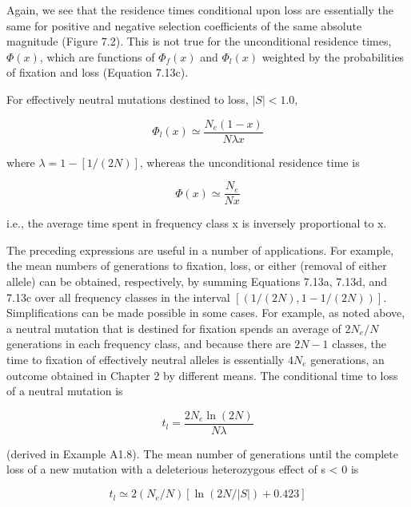 \documentclass{article}
\begin{document}
Again, we see that the residence times conditional upon loss are essentially the same for positive and negative selection coefficients of the same absolute magnitude (Figure 7.2). This is not true for the unconditional residence times,  $ \Phi(x) $, which are functions of  $ \Phi_f(x) $ and  $ \Phi_l(x) $ weighted by the probabilities of fixation and loss (Equation 7.13c).

For effectively neutral mutations destined to loss,  $ |S| < 1.0 $,

\begin{equation}
\Phi_{l}(x)\simeq\frac{N_{e}(1-x)}{N\lambda x}
\tag{7.14a}
\label{eq:7_14a}
\end{equation}

where  $ \lambda = 1 - [1/(2N)] $, whereas the unconditional residence time is

\begin{equation}
\Phi(x)\simeq\frac{N_{e}}{Nx}
\tag{7.14b}
\label{eq:7_14b}
\end{equation}

i.e., the average time spent in frequency class x is inversely proportional to x.

The preceding expressions are useful in a number of applications. For example, the mean numbers of generations to fixation, loss, or either (removal of either allele) can be obtained, respectively, by summing Equations 7.13a, 7.13d, and 7.13c over all frequency classes in the interval  $ [(1/(2N), 1 - 1/(2N))] $. Simplifications can be made possible in some cases. For example, as noted above, a neutral mutation that is destined for fixation spends an average of  $ 2N_e/N $ generations in each frequency class, and because there are  $ 2N - 1 $ classes, the time to fixation of effectively neutral alleles is essentially  $ 4N_e $ generations, an outcome obtained in Chapter 2 by different means. The conditional time to loss of a neutral mutation is

\begin{equation}
t_{l}=\frac{2N_{e}\ln(2N)}{N\lambda}
\tag{7.15}
\label{eq:7_15}
\end{equation}

(derived in Example A1.8). The mean number of generations until the complete loss of a new mutation with a deleterious heterozygous effect of s < 0 is

\begin{equation}
t_{l}\simeq2(N_{e}/N)[\ln(2N/|S|)+0.423]
\tag{7.16}
\label{eq:7_16}
\end{equation}
\end{document}
